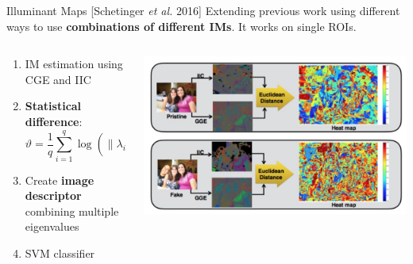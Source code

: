 \begin{tframe}{Illuminant Maps {\small [Schetinger \emph{et al.} 2016]}}
\vspace{0.1cm}
Extending previous work using different ways to use \textbf{combinations of different IMs}. It works on single ROIs.
\vspace{0.2cm}
\begin{minipage}{\textwidth}
\begin{columns}[T]
\begin{column}{0.5\textwidth}
\vspace{0.4cm}
\begin{small}
\begin{enumerate}
\item IM estimation using CGE and IIC
\item \textbf{Statistical difference}:
$$\vartheta = \frac{1}{q} \sum_{i = 1}^{q} \log (\| \lambda_i*(g_{GCE})^2 - \lambda_i*(f_{IIC})^2 \|)$$
\item Create \textbf{image descriptor} combining multiple eigenvalues
\item SVM classifier
\end{enumerate}

\end{small}
\end{column}
\begin{column}{0.4\textwidth}
\centering
\vspace{1.5cm}

\includegraphics[width=\textwidth]{images/victor.jpg}
\end{column}
\end{columns}
\end{minipage}

\end{tframe}


